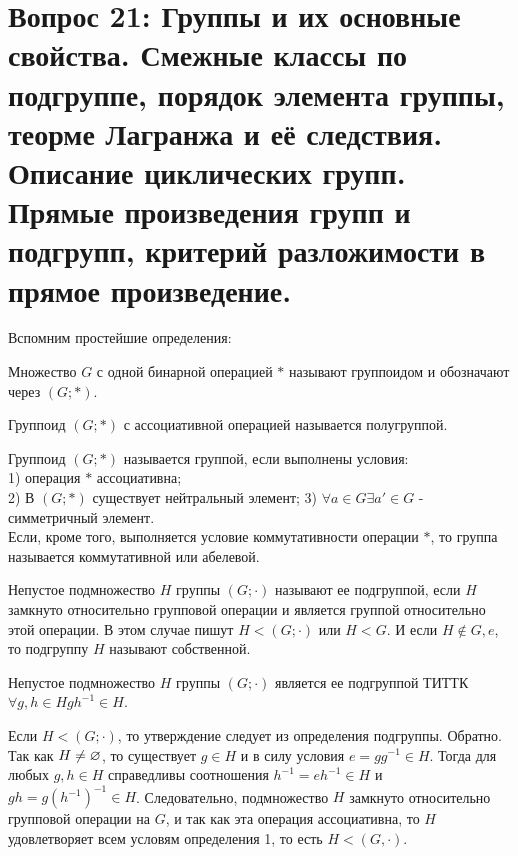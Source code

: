 \section{Вопрос 21: Группы и их основные свойства.
Смежные классы по подгруппе, порядок элемента группы, теорме Лагранжа и её следствия.
Описание циклических групп.
Прямые произведения групп и  подгрупп, критерий разложимости в прямое произведение.}


Вспомним простейшие определения: \\
\begin{defs}[Группоид]
  Множество $G$ с одной бинарной операцией $*$ называют группоидом и обозначают через $(G;*)$.
\end{defs}

\begin{defs}[Полугруппа]
  Группоид $(G;*)$ с ассоциативной операцией называется полугруппой.
\end{defs}

\begin{defs}[Полугруппа]
  Группоид $(G;*)$ называется группой, если выполнены условия:\\
  1) операция $*$ ассоциативна;\\
  2) В $(G;*)$ существует нейтральный элемент;
  3) $\forall a \in G \exists a' \in G$ - симметричный элемент. \\
  Если, кроме того, выполняется условие коммутативности операции $*$, то группа называется коммутативной или абелевой.
\end{defs}

\begin{defs}[Подгруппа]
  Непустое подмножество $H$ группы $(G;\cdot)$ называют ее подгруппой, если $H$ замкнуто относительно
  групповой операции и является группой относительно этой операции. В этом случае пишут $H < (G;\cdot)$ или $H < G$.
  И если $H \notin {G, {e}}$, то подгруппу $H$ называют собственной.
\end{defs}

\begin{claim}
 Непустое подмножество $H$ группы $(G;\cdot)$ является ее подгруппой ТИТТК $\forall g,h \in H gh^{-1} \in H$.
 \begin{dokvo}
 Если $H < (G;\cdot)$, то утверждение следует из определения подгруппы. Обратно. Так как $H \neq \varnothing$, то существует $g \in H$ и
 в силу условия $e = gg^{-1} \in H$. Тогда для любых $g, h \in H$ справедливы соотношения $h^{-1} = eh^{-1} \in H$ и
 $gh = g(h^{-1})^{-1} \in H$. Следовательно, подмножество $H$ замкнуто относительно групповой операции на $G$, и так как эта
 операция ассоциативна, то $H$ удовлетворяет всем условям определения 1, то есть $H < (G,\cdot)$.
 \end{dokvo}
\end{claim}

